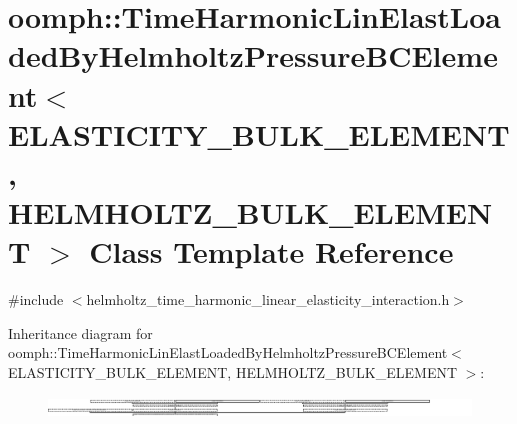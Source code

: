 \hypertarget{classoomph_1_1TimeHarmonicLinElastLoadedByHelmholtzPressureBCElement}{}\section{oomph\+:\+:Time\+Harmonic\+Lin\+Elast\+Loaded\+By\+Helmholtz\+Pressure\+B\+C\+Element$<$ E\+L\+A\+S\+T\+I\+C\+I\+T\+Y\+\_\+\+B\+U\+L\+K\+\_\+\+E\+L\+E\+M\+E\+NT, H\+E\+L\+M\+H\+O\+L\+T\+Z\+\_\+\+B\+U\+L\+K\+\_\+\+E\+L\+E\+M\+E\+NT $>$ Class Template Reference}
\label{classoomph_1_1TimeHarmonicLinElastLoadedByHelmholtzPressureBCElement}


{\ttfamily \#include $<$helmholtz\+\_\+time\+\_\+harmonic\+\_\+linear\+\_\+elasticity\+\_\+interaction.\+h$>$}

Inheritance diagram for oomph\+:\+:Time\+Harmonic\+Lin\+Elast\+Loaded\+By\+Helmholtz\+Pressure\+B\+C\+Element$<$ E\+L\+A\+S\+T\+I\+C\+I\+T\+Y\+\_\+\+B\+U\+L\+K\+\_\+\+E\+L\+E\+M\+E\+NT, H\+E\+L\+M\+H\+O\+L\+T\+Z\+\_\+\+B\+U\+L\+K\+\_\+\+E\+L\+E\+M\+E\+NT $>$\+:\begin{figure}[H]
\begin{center}
\leavevmode
\includegraphics[height=0.562814cm]{classoomph_1_1TimeHarmonicLinElastLoadedByHelmholtzPressureBCElement}
\end{center}
\end{figure}
